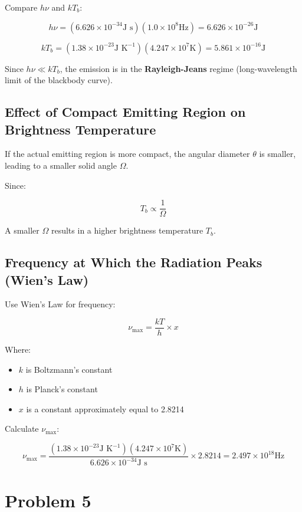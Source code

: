 \documentclass[12pt]{article}
\begin{document}
Compare $h \nu$ and $k T_b$:

\[
    h \nu = (6.626 \times 10^{-34}\text{J s})(1.0 \times 10^{8}\text{Hz}) = 6.626 \times 10^{-26}\text{J}
\]

\[
    k T_b = (1.38 \times 10^{-23}\text{J K}^{-1})(4.247 \times 10^{7}\text{K}) = 5.861 \times 10^{-16}\text{J}
\]

Since $h \nu \ll k T_b$, the emission is in the \textbf{Rayleigh-Jeans} regime (long-wavelength limit of the blackbody curve).

\bigskip

\subsection{Effect of Compact Emitting Region on Brightness Temperature}

If the actual emitting region is more compact, the angular diameter $\theta$ is smaller, leading to a smaller solid angle $\Omega$.

Since:

\[
    T_b \propto \dfrac{1}{\Omega}
\]

A smaller $\Omega$ results in a higher brightness temperature $T_b$.

\bigskip

\subsection{Frequency at Which the Radiation Peaks (Wien's Law)}

Use Wien's Law for frequency:

\[
    \nu_{\text{max}} = \dfrac{k T}{h} \times x
\]

Where:
\begin{itemize}
    \item $k$ is Boltzmann's constant
    \item $h$ is Planck's constant
    \item $x$ is a constant approximately equal to 2.8214
\end{itemize}

Calculate $\nu_{\text{max}}$:

\[
    \nu_{\text{max}} = \dfrac{(1.38 \times 10^{-23}\text{J K}^{-1})(4.247 \times 10^{7}\text{K})}{6.626 \times 10^{-34}\text{J s}} \times 2.8214 = 2.497 \times 10^{18}\text{Hz}
\]

\newpage

\section{Problem 5}

\newpage



\nocite{El-Deeb_PEU-438_Assignments}
\end{document}
